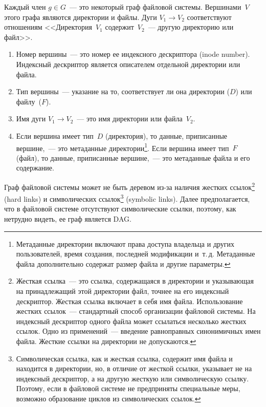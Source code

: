 \begin{multicols}{2}
\vspace*{-2pt}

      Каждый член $g\in G$~--- это некоторый граф файловой системы. 
Вершинами~$V$ этого графа являются директории и файлы. Дуги 
$V_1\rightarrow V_2$ соответствуют отношениям <<Директория~$V_1$ 
содержит~$V_2$~--- другую директорию или файл>>. 
\begin{enumerate}[1.]
\item Номер вершины~--- это номер ее индексного дескриптора (inode 
number). Индексный дескриптор является описателем отдельной директории 
или файла.\\[-14pt]
\item Тип вершины~--- указание на то, соответствует ли она директории 
($D$) или файлу~($F$).\\[-14pt]
\item Имя дуги $V_1\rightarrow V_2$~--- это имя директории или 
файла~$V_2$.\\[-14pt]
\item Если вершина имеет тип~$D$ (директория), то данные, приписанные 
вершине,~--- это метаданные директории\footnote{Метаданные директории 
включают права доступа владельца и других пользователей, время создания, последней 
модификации и~т.\,д. Метаданные файла дополнительно содержат размер файла и другие 
параметры.}. Если вершина имеет тип~$F$ (файл), то данные, приписанные 
вершине,~--- это метаданные файла и его содержание.
\end{enumerate}

      Граф файловой системы может не быть деревом из-за наличия жестких 
ссылок\footnote{Жесткая ссылка~--- это ссылка, содержащаяся в директории и 
указывающая на принадлежащий этой директории файл, точнее на его индексный 
дескриптор. Жесткая ссылка включает в себя имя файла. Использование жестких ссылок~--- 
стандартный способ организации файловой системы. На индексный дескриптор одного 
файла может ссылаться несколько жестких ссылок. Одно из применений~--- введение 
равноправных синонимичных имен файла. Жесткие ссылки на директории не допускаются.} 
(hard links) и символических ссылок\footnote{Символическая ссылка, как и жесткая 
ссылка, содержит имя файла и находится в директории, но, в отличие от жесткой ссылки, 
указывает не на индексный дескриптор, а на другую жесткую или символическую ссылку. 
Поэтому, если в файловой системе не предприняты специальные меры, возможно 
образование циклов из символических ссылок.} (symbolic links). Далее предполагается, 
что в файловой системе отсутствуют символические ссылки, поэтому, как 
нетрудно видеть, ее граф является DAG.


\end{multicols}
